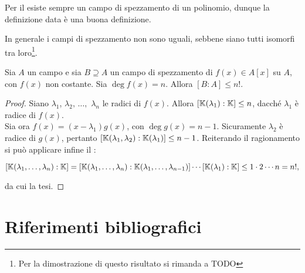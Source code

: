 \documentclass[11pt]{scrbook}
\begin{document}
\begin{remark*}
    Per il  esiste sempre un campo di spezzamento
    di un polinomio, dunque la definizione data è una buona definizione.
\end{remark*}

\begin{remark*}
    In generale i campi di spezzamento non sono uguali, sebbene siano tutti
    isomorfi tra loro\footnote{Per la dimostrazione di questo risultato
        si rimanda a TODO}.
\end{remark*}

\begin{theorem}
    Sia $A$ un campo e sia $B \supseteq A$ un campo di spezzamento
    di $f(x) \in A[x]$ su $A$, con $f(x)$ non costante. Sia $\deg f(x) = n$.
    Allora $[B : A] \leq n!$.
\end{theorem}

\begin{proof}
    Siano $\lambda_1$, $\lambda_2,\,\ldots,$ $\lambda_n$ le radici
    di $f(x)$. Allora $[\mathbb{K}(\lambda_1) : \mathbb{K}] \leq n$, dacché
    $\lambda_1$ è radice di $f(x)$. \\
    
    Sia ora $f(x)=(x-\lambda_1)g(x)$, con $\deg g(x) = n-1$. Sicuramente
    $\lambda_2$ è radice di $g(x)$, pertanto $[\mathbb{K}(\lambda_1, \lambda_2) : \mathbb{K}(\lambda_1)] \leq n-1$. Reiterando il ragionamento si può applicare infine il :
    
    \[ [\mathbb{K}(\lambda_1, \ldots, \lambda_n) : \mathbb{K}] = [\mathbb{K}(\lambda_1, \ldots, \lambda_n) : \mathbb{K}(\lambda_1, \ldots, \lambda_{n-1})] \cdots [\mathbb{K}(\lambda_1) : \mathbb{K}] \leq 1 \cdot 2 \cdots n = n!, \]
    
    \vskip 0.1in
    
    da cui la tesi.
\end{proof}

\chapter{Riferimenti bibliografici}
\printbibliography[heading=none]
\end{document}
